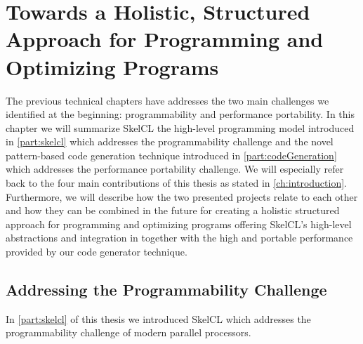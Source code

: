 
\chapter[Towards a Holistic, Structured Programming Approach]{Towards a Holistic, Structured Approach for Programming and Optimizing Programs}

\label{ch:seventh} %

The previous technical chapters have addresses the two main challenges we identified at the beginning: programmability and performance portability.
In this chapter we will summarize SkelCL the high-level programming model introduced in \autoref{part:skelcl} which addresses the programmability challenge and the novel pattern-based code generation technique introduced in \autoref{part:codeGeneration} which addresses the performance portability challenge.
We will especially refer back to the four main contributions of this thesis as stated in \autoref{ch:introduction}.
Furthermore, we will describe how the two presented projects relate to each other and how they can be combined in the future for creating a holistic structured approach for programming and optimizing programs offering SkelCL's high-level abstractions and integration in \Cpp together with the high and portable performance provided by our code generator technique.

\section{Addressing the Programmability Challenge}

In \autoref{part:skelcl} of this thesis we introduced SkelCL which addresses the programmability challenge of modern parallel processors.

